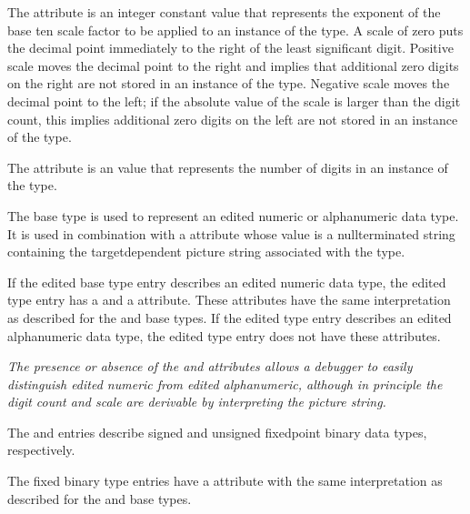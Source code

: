 \hypertarget{chap:DWATdecimalscaledecimalscalefactor}{}
The \DWATdecimalscale{}
attribute 
is an integer constant value
that represents the exponent of the base ten scale factor to
be applied to an instance of the type. A scale of zero puts the
decimal point immediately to the right of the least significant
digit. Positive scale moves the decimal point to the right
and implies that additional zero digits on the right are not
stored in an instance of the type. Negative scale moves the
decimal point to the left; if the absolute value of the scale
is larger than the digit count, this implies additional zero
digits on the left are not stored in an instance of the type.

The 
\DWATdigitcount{}
attribute 
is an 
value that represents the number of digits in an instance of
the type.

The \DWATEedited{}
base 
\hypertarget{chap:DWATpicturestringpicturestringfornumericstringtype}{}
type is used to represent an edited
numeric or alphanumeric data type. It is used in combination
with a \DWATpicturestring{} attribute whose value is a 
null\dash terminated string containing the target\dash dependent picture
string associated with the type.

If the edited base type entry describes an edited numeric
data type, the edited type entry has a \DWATdigitcount{} and a
\DWATdecimalscale{} attribute. 
These attributes have the same
interpretation as described for the 
\DWATEpackeddecimal{} and
\DWATEnumericstring{} base 
types. If the edited type entry
describes an edited alphanumeric data type, the edited type
entry does not have these attributes.


\textit{The presence or absence of the \DWATdigitcount{} and
\DWATdecimalscale{} attributes 
allows a debugger to easily
distinguish edited numeric from edited alphanumeric, although
in principle the digit count and scale are derivable by
interpreting the picture string.}

The \DWATEsignedfixed{} and \DWATEunsignedfixed{} entries
describe signed and unsigned fixed\dash point binary data types,
respectively.

The fixed binary type entries have 
a 
\DWATdigitcount{}
attribute with the same interpretation as described for the
\DWATEpackeddecimal{} and \DWATEnumericstring{} base types.

